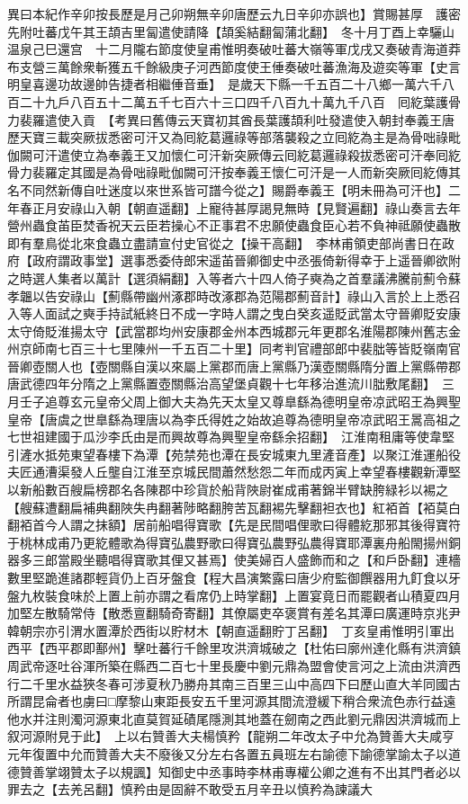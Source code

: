 異曰本紀作辛卯按長歷是月己卯朔無辛卯唐歷云九日辛卯亦誤也】賞賜甚厚　護密先附吐蕃戊午其王頡吉里匐遣使請降【頡奚結翻匐蒲北翻】　冬十月丁酉上幸驪山温泉己巳還宫　十二月隴右節度使皇甫惟明奏破吐蕃大嶺等軍戊戌又奏破青海道莽布支營三萬餘衆斬獲五千餘級庚子河西節度使王倕奏破吐蕃漁海及遊奕等軍【史言明皇喜邊功故邊帥告捷者相繼倕音垂】　是歲天下縣一千五百二十八鄉一萬六千八百二十九戶八百五十二萬五千七百六十三口四千八百九十萬九千八百　囘紇葉護骨力裴羅遣使入貢　【考異曰舊傳云天寶初其酋長葉護頡利吐發遣使入朝封奉義王唐歷天寶三載突厥拔悉密可汗又為囘紇葛邏祿等部落襲殺之立囘紇為主是為骨咄祿毗伽闕可汗遣使立為奉義王又加懷仁可汗新突厥傳云囘紇葛邏祿殺拔悉密可汗奉囘紇骨力裴羅定其國是為骨咄祿毗伽闕可汗按奉義王懷仁可汗是一人而新突厥囘紇傳其名不同然新傳自吐迷度以來世系皆可譜今從之】賜爵奉義王【明未冊為可汗也】二年春正月安祿山入朝【朝直遥翻】上寵待甚厚謁見無時【見賢遍翻】祿山奏言去年營州蟲食苖臣焚香祝天云臣若操心不正事君不忠願使蟲食臣心若不負神祗願使蟲散即有羣鳥從北來食蟲立盡請宣付史官從之【操干高翻】　李林甫領吏部尚書日在政府【政府謂政事堂】選事悉委侍郎宋遥苖晉卿御史中丞張倚新得幸于上遥晉卿欲附之時選人集者以萬計【選須絹翻】入等者六十四人倚子奭為之首羣議沸騰前薊令蘇孝韞以告安祿山【薊縣帶幽州涿郡時改涿郡為范陽郡薊音計】祿山入言於上上悉召入等人面試之奭手持試紙終日不成一字時人謂之曳白癸亥遥貶武當太守晉卿貶安康太守倚貶淮揚太守【武當郡均州安康郡金州本西城郡元年更郡名淮陽郡陳州舊志金州京師南七百三十七里陳州一千五百二十里】同考判官禮部郎中裴朏等皆貶嶺南官晉卿壺關人也【壺關縣自漢以來屬上黨郡而唐上黨縣乃漢壺關縣隋分置上黨縣帶郡唐武德四年分隋之上黨縣置壺關縣治高望堡貞觀十七年移治進流川朏敷尾翻】　三月壬子追尊玄元皇帝父周上御大夫為先天太皇又尊臯繇為德明皇帝凉武昭王為興聖皇帝【唐虞之世臯繇為理唐以為李氏得姓之始故追尊為德明皇帝凉武昭王暠高祖之七世祖建國于瓜沙李氏由是而興故尊為興聖皇帝繇余招翻】　江淮南租庸等使韋堅引滻水抵苑東望春樓下為潭【苑禁苑也潭在長安城東九里滻音產】以聚江淮運船役夫匠通漕渠發人丘壟自江淮至京城民間蕭然愁怨二年而成丙寅上幸望春樓觀新潭堅以新船數百艘扁榜郡名各陳郡中珍貨於船背陜尉崔成甫著錦半臂缺胯緑衫以裼之【艘蘇遭翻扁補典翻陜失冉翻著陟略翻胯苦瓦翻裼先擊翻袒衣也】紅袹首【袹莫白翻袹首今人謂之抹額】居前船唱得寶歌【先是民間唱俚歌曰得體紇那邪其後得寶符于桃林成甫乃更紇體歌為得寶弘農野歌曰得寶弘農野弘農得寶耶潭裏舟船閙揚州銅器多三郎當殿坐聽唱得寶歌其俚又甚焉】使美婦百人盛飾而和之【和戶卧翻】連檣數里堅跪進諸郡輕貨仍上百牙盤食【程大昌演繁露曰唐少府監御饌器用九飣食以牙盤九枚裝食味於上置上前亦謂之看席仍上時掌翻】上置宴竟日而罷觀者山積夏四月加堅左散騎常侍【散悉亶翻騎奇寄翻】其僚屬吏卒褒賞有差名其潭曰廣運時京兆尹韓朝宗亦引渭水置潭於西街以貯材木【朝直遥翻貯丁呂翻】　丁亥皇甫惟明引軍出西平【西平郡即鄯州】擊吐蕃行千餘里攻洪濟城破之【杜佑曰廓州達化縣有洪濟鎮周武帝逐吐谷渾所築在縣西二百七十里長慶中劉元鼎為盟會使言河之上流由洪濟西行二千里水益狹冬春可涉夏秋乃勝舟其南三百里三山中高四下曰歷山直大羊同國古所謂昆侖者也虜曰□摩黎山東距長安五千里河源其間流澄緩下稍合衆流色赤行益遠他水并注則濁河源東北直莫賀延磧尾隱測其地蓋在劒南之西此劉元鼎因洪濟城而上叙河源附見于此】　上以右贊善大夫楊慎矜【龍朔二年改太子中允為贊善大夫咸亨元年復置中允而贊善大夫不廢後又分左右各置五員班左右諭德下諭德掌諭太子以道德贊善掌翊贊太子以規諷】知御史中丞事時李林甫專權公卿之進有不出其門者必以罪去之【去羌呂翻】慎矜由是固辭不敢受五月辛丑以慎矜為諫議大